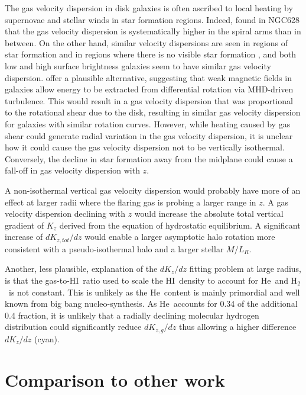 \documentclass[traditabstract]{aa} %
\newcommand\HI{H{\small I}}
\newcommand\He{He}
\newcommand\Htwo{H$_2$}
\begin{document}
The gas velocity dispersion in disk galaxies is often ascribed to local 
heating by supernovae and stellar winds in star formation regions. 
Indeed, \citet{svdk1984} found in NGC628 that the gas velocity dispersion
is systematically higher in the spiral arms than in between. 
On the other hand, similar velocity dispersions are seen in
regions of star formation and in regions where there is no visible
star formation \citep[e.g. ][]{mcbf1996}, and both low and high
surface brightness galaxies seem to have similar gas velocity
dispersion.  \citet[][]{sb1999} offer a plausible alternative,
suggesting that weak magnetic fields in galaxies allow energy to be
extracted from differential rotation via MHD-driven turbulence. This
would result in a gas velocity dispersion that was proportional to the
rotational shear due to the disk, resulting in similar gas velocity
dispersion for galaxies with similar rotation curves.  
However, while heating caused by gas shear
could generate radial variation in the gas velocity dispersion, it is
unclear how it could cause the gas velocity dispersion not to be
vertically isothermal. Conversely, the decline in star
formation away from the midplane could cause a fall-off in gas
velocity dispersion with $z$.

A non-isothermal vertical gas velocity dispersion would
probably have more of an effect at larger radii where the flaring
gas is probing a larger range in $z$. A gas velocity dispersion
declining with $z$ would increase the absolute total vertical
gradient of $K_z$ derived from the equation of hydrostatic equilibrium.
A significant increase of $dK_{z,tot}/dz$ would enable a
larger asymptotic halo rotation more consistent with a pseudo-isothermal
halo and a larger stellar $M/L_R$.

Another, less plausible, explanation of the $dK_z/dz$ fitting problem at
large radius, is that the gas-to-\HI\ ratio used to scale the \HI\ density
to account for \He\ and \Htwo\ is not constant. This is unlikely as the
\He\ content is mainly primordial and well known from big bang
nucleo-synthesis.  As \He\ accounts for 0.34 of the additional
0.4 fraction, it is unlikely that a radially declining molecular
hydrogen distribution could significantly reduce $dK_{z,g}/dz$ thus
allowing a higher difference $dK_z/dz$ (cyan).  



\section{Comparison to other work}
\label{sec:ch7-comparison}
\end{document}
